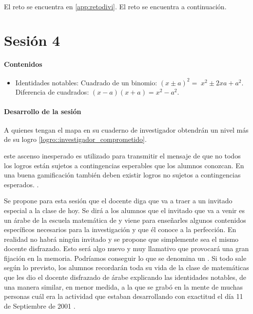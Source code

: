 \ifinapp
	El reto se encuentra en \ref{app:retodivi}.
\else 
	El reto se encuentra a continuación.
	
\fi



\section{Sesión 4}


\paragraph{Contenidos}
\begin{itemize}
	\item Identidades notables: 
	\subitem Cuadrado de un binomio: $(x\pm a)^2 = \;x^2\pm 2xa + a^2$.
	\subitem Diferencia de cuadrados: $(x-a)(x+a) = x^2-a^2$.
\end{itemize}

\paragraph{Desarrollo de la sesión}

A quienes tengan el mapa en su cuaderno de investigador obtendrán un nivel más de su logro \ref{logro::investigador_comprometido}.

\Justificacion{} este ascenso inesperado es utilizado para transmitir el mensaje de que no todos los logros están sujetos a contingencias esperables que los alumnos conozcan.
%
En una buena gamificación también deben existir logros no sujetos a contingencias esperados. \citep{werbach2012win}.

Se propone para esta sesión que el docente diga que va a traer a un invitado especial a la clase de hoy.
%
Se dirá a los alumnos que el invitado que va a venir es un árabe de la escuela matemática de \arab y viene para enseñarles algunos contenidos específicos necesarios para la investigación y que él conoce a la perfección.
%
En realidad no habrá ningún invitado y se propone que simplemente sea el mismo docente disfrazado.
%
Esto será algo nuevo y muy llamativo que provocará una gran fijación en la memoria.
%
Podríamos conseguir lo que se denomina un .
Si todo sale según lo previsto, los alumnos recordarán toda su vida de la clase de matemáticas que les dio el docente disfrazado de árabe explicando las identidades notables, 
%
de una manera similar, en menor medida, a la que se grabó en la mente de muchas personas cuál era la actividad que estaban desarrollando con exactitud el día 11 de Septiembre de 2001 \citep{11s}.

